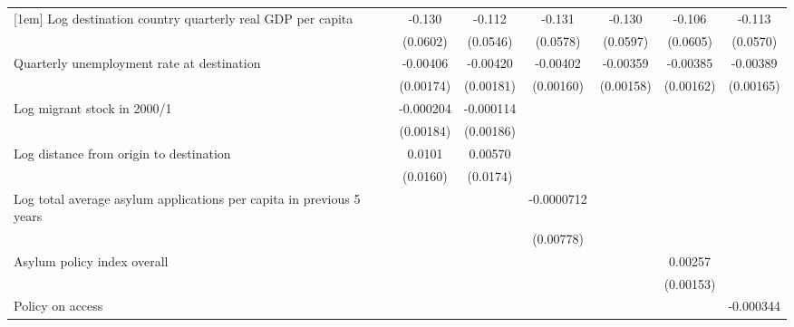 \begin{table}[htbp]
\begin{tabular}{l*{6}{c}}
[1em]
Log destination country quarterly real GDP per capita&      -0.130\sym{*}  &      -0.112\sym{*}  &      -0.131\sym{*}  &      -0.130\sym{*}  &      -0.106         &      -0.113         \\
                    &    (0.0602)         &    (0.0546)         &    (0.0578)         &    (0.0597)         &    (0.0605)         &    (0.0570)         \\
[1em]
Quarterly unemployment rate at destination&    -0.00406\sym{*}  &    -0.00420\sym{*}  &    -0.00402\sym{*}  &    -0.00359\sym{*}  &    -0.00385\sym{*}  &    -0.00389\sym{*}  \\
                    &   (0.00174)         &   (0.00181)         &   (0.00160)         &   (0.00158)         &   (0.00162)         &   (0.00165)         \\
[1em]
Log migrant stock in 2000/1&   -0.000204         &   -0.000114         &                     &                     &                     &                     \\
                    &   (0.00184)         &   (0.00186)         &                     &                     &                     &                     \\
[1em]
Log distance from origin to destination&      0.0101         &     0.00570         &                     &                     &                     &                     \\
                    &    (0.0160)         &    (0.0174)         &                     &                     &                     &                     \\
[1em]
Log total average asylum applications per capita in previous 5 years&                     &                     &  -0.0000712         &                     &                     &                     \\
                    &                     &                     &   (0.00778)         &                     &                     &                     \\
[1em]
Asylum policy index overall&                     &                     &                     &                     &     0.00257         &                     \\
                    &                     &                     &                     &                     &   (0.00153)         &                     \\
[1em]
Policy on access    &                     &                     &                     &                     &                     &   -0.000344         \\

\end{tabular}
\end{table}
